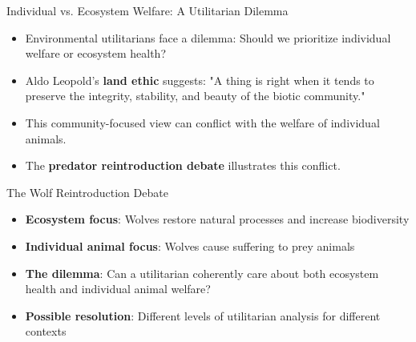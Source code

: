 \documentclass{beamer}
\begin{document}
	\begin{frame}{Individual vs. Ecosystem Welfare: A Utilitarian Dilemma}
		\begin{itemize}
			\item Environmental utilitarians face a dilemma: Should we prioritize individual welfare or ecosystem health?
			\item Aldo Leopold's \textbf{land ethic} suggests: "A thing is right when it tends to preserve the integrity, stability, and beauty of the biotic community."
			\item This community-focused view can conflict with the welfare of individual animals.
			\item The \textbf{predator reintroduction debate} illustrates this conflict.
		\end{itemize}
		
		\begin{alertblock}{The Wolf Reintroduction Debate}
			\begin{itemize}
				\item \textbf{Ecosystem focus}: Wolves restore natural processes and increase biodiversity
				\item \textbf{Individual animal focus}: Wolves cause suffering to prey animals
				\item \textbf{The dilemma}: Can a utilitarian coherently care about both ecosystem health and individual animal welfare?
				\item \textbf{Possible resolution}: Different levels of utilitarian analysis for different contexts
			\end{itemize}
		\end{alertblock}
	\end{frame}
	
\end{document}
